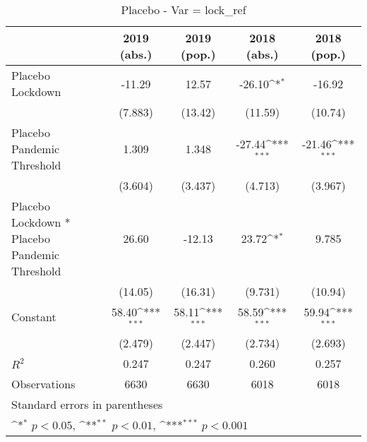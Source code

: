 \documentclass{article}
\begin{document}
{
\def\sym#1{\ifmmode^{#1}\else\(^{#1}\)\fi}
\begin{longtable}{l*{4}{c}}
\caption{Placebo - Var = lock\_ref}\\
\hline\hline\endfirsthead\hline\endhead\hline\endfoot\endlastfoot
                &\multicolumn{1}{c}{2019 (abs.)}&\multicolumn{1}{c}{2019 (pop.)}&\multicolumn{1}{c}{2018 (abs.)}&\multicolumn{1}{c}{2018 (pop.)}\\
\hline
Placebo Lockdown&   -11.29         &    12.57         &   -26.10\sym{*}  &   -16.92         \\
                &  (7.883)         &  (13.42)         &  (11.59)         &  (10.74)         \\
Placebo Pandemic Threshold&    1.309         &    1.348         &   -27.44\sym{***}&   -21.46\sym{***}\\
                &  (3.604)         &  (3.437)         &  (4.713)         &  (3.967)         \\
Placebo Lockdown * Placebo Pandemic Threshold&    26.60         &   -12.13         &    23.72\sym{*}  &    9.785         \\
                &  (14.05)         &  (16.31)         &  (9.731)         &  (10.94)         \\
Constant        &    58.40\sym{***}&    58.11\sym{***}&    58.59\sym{***}&    59.94\sym{***}\\
                &  (2.479)         &  (2.447)         &  (2.734)         &  (2.693)         \\
\hline
\(R^{2}\)       &    0.247         &    0.247         &    0.260         &    0.257         \\
Observations    &     6630         &     6630         &     6018         &     6018         \\
\hline\hline
\multicolumn{5}{l}{\footnotesize Standard errors in parentheses}\\
\multicolumn{5}{l}{\footnotesize \sym{*} \(p<0.05\), \sym{**} \(p<0.01\), \sym{***} \(p<0.001\)}\\
\end{longtable}
}
\end{document}
